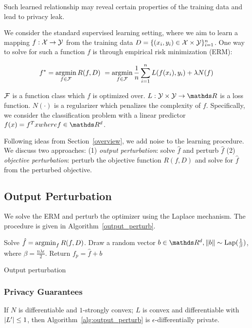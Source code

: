 \documentclass{article} %
\begin{document}
Such learned relationship may reveal certain properties of the training data and lead to privacy leak.

We consider the standard supervised learning setting, where we aim to learn a mapping $f: \X \rightarrow \Y$ from the training data $D = \{(x_i, y_i) \in \X \times \Y\}_{i=1}^n$. One way to solve for such a function $f$ is through empirical risk minimization (ERM):


$$f^* = \argmin_{f\in \F} R(f, D) \ =\argmin_{f\in \F} \frac{1}{n}\sum_{i=1}^n L(f(x_i), y_i) + \lambda N(f)$$

$\F$ is a function class which $f$ is optimized over. $L:\Y \times \Y \rightarrow \R$ is a loss function. $N(\cdot)$ is a regularizer which penalizes the complexity of $f$. Specifically, we consider the classification problem with a linear predictor $f(x) = f^T x where f\in \R^d$.

Following ideas from Section~\ref{overview}, we add noise to the learning procedure. We discuss two approaches: (1) \emph{output perturbation}: solve $\hat{f}$ and perturb $\hat{f}$ (2) \emph{objective perturbation}: perturb the objective function $R(f, D)$ and solve for $\hat{f}$ from the perturbed objective.

\subsection{Output Perturbation}
We solve the ERM and perturb the optimizer using the Laplace mechanism. The procedure is given in Algorithm~\ref{output_perturb}.

\begin{algorithm}[htb]
\begin{algorithmic}[1]
	\State Solve $\hat{f} = \argmin_f R(f, D)$.
	\State Draw a random vector $b\in \R^d, \norm{b}\sim \text{Lap}(\frac{1}{\beta})$, where $\beta = \frac{n\lambda \epsilon}{2}$.
    \State Return $f_{p} = \hat{f} + b$
   \EndFunction
\end{algorithmic}
\caption{Output perturbation}\label{alg:output_perturb}
\end{algorithm}

\subsubsection{Privacy Guarantees}
\begin{theorem}
If $N$ is differentiable and $1$-strongly convex; $L$ is convex and differentiable with $\abs*{L'} \le 1$, then Algorithm~\ref{alg:output_perturb} is $\epsilon$-differentially private.
\end{theorem}
\end{document}

